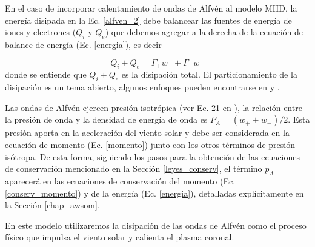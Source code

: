 \documentclass[a4paper,11pt]{report}
\begin{document}
En el caso de incorporar calentamiento de ondas de Alfvén al modelo MHD, la energía disipada en la Ec. \ref{alfven_2} debe balancear las fuentes de energía de iones y electrones ($Q_i$ y $Q_e$) que debemos agregar a la derecha de la ecuación de balance de energía (Ec. \ref{energia}), es decir

\begin{equation}
  Q_i +Q_e = \Gamma_+ w_+ + \Gamma_- w_-
\end{equation}
donde se entiende que $Q_i + Q_e$ es la disipación total. El particionamiento de la disipación es un tema abierto, algunos enfoques pueden encontrarse en \citet{hollweg_1986} y \citet{vander_2014}.

Las ondas de Alfvén ejercen presión isotrópica (ver Ec. 21 en \citet{jacques_1977}), la relación entre la presión de onda y la densidad de energía de onda es $P_A = (w_+ + w_-)/2$. Esta presión aporta en la aceleración del viento solar y debe ser considerada en la ecuación de momento (Ec. \ref{momento}) junto con los otros términos de presión isótropa. De esta forma, siguiendo los pasos para la obtención de las ecuaciones de conservación mencionado en la Sección \ref{leyes_conserv}, el término $p_A$ aparecerá en las ecuaciones de conservación del momento (Ec. \ref{conserv_momento}) y de la energía (Ec. \ref{energia}), detalladas explícitamente en la Sección \ref{chap_awsom}.




{En este modelo utilizaremos la disipación de las ondas de Alfvén como el proceso físico que impulsa el viento solar y calienta el plasma coronal.}


\end{document}
